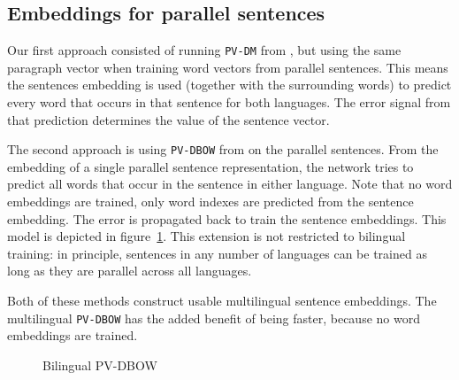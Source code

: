\subsection{Embeddings for parallel sentences}



Our first approach consisted of running \texttt{PV-DM} from \cite{Le2014}, 
but using the same paragraph vector when training word vectors from parallel sentences.
This means the sentences embedding is used (together with the surrounding words) to predict every word that occurs in that sentence for both languages.
The error signal from that prediction determines the value of the sentence vector.



The second approach is using \texttt{PV-DBOW} from \cite{Le2014} on the parallel sentences.
From the embedding of a single parallel sentence representation, the network tries to predict all words that occur in the sentence in either language.
Note that no word embeddings are trained, only word indexes are predicted from the sentence embedding.
The error is propagated back to train the sentence embeddings.
This model is depicted in figure~\ref{f:bilingual_dbow}. This extension is not restricted to bilingual training: in principle, sentences in any number of languages can be trained as long as they are parallel across all languages.


Both of these methods construct usable multilingual sentence embeddings.
The multilingual \texttt{PV-DBOW} has the added benefit of being faster, because no word embeddings are trained.


\begin{figure}

\center

\caption{Bilingual PV-DBOW}
\label{f:bilingual_dbow}
\end{figure}


% 

